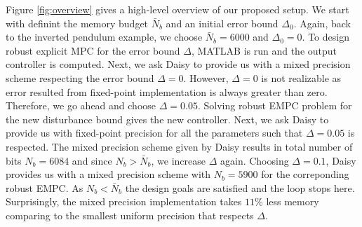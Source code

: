 	Figure \ref{fig:overview} gives a high-level overview of our proposed setup. We start with definint the memory budget $\bar N_b$ and an initial error bound $\Delta_0$. Again, back to the inverted pendulum example, we choose $\bar N_b=6000$ and $\Delta_0=0$. To design robust explicit MPC for the error bound $\Delta$, MATLAB is run and the output controller is computed. Next, we ask Daisy to provide us with a mixed precision scheme respecting the error bound $\Delta=0$. However, $\Delta=0$ is not realizable as error resulted from fixed-point implementation is always greater than zero. Therefore, we go ahead and choose $\Delta=0.05$. Solving robust EMPC problem for the new disturbance bound gives the new controller. Next, we ask Daisy to provide us with fixed-point precision for all the parameters such that $\Delta=0.05$ is respected. The mixed precision scheme given by Daisy results in total number of bits $N_b=6084$ and since $N_b>\bar N_b$, we increase $\Delta$ again. Choosing $\Delta=0.1$, Daisy provides us with a mixed precision scheme with $N_b=5900$ for the correponding robust EMPC. As $N_b<\bar N_b$ the design goals are satisfied and the loop stops here. Surprisingly, the mixed precision implementation takes $11\%$ less memory comparing to the smallest uniform precision that respects $\Delta$. 
	
	
	
